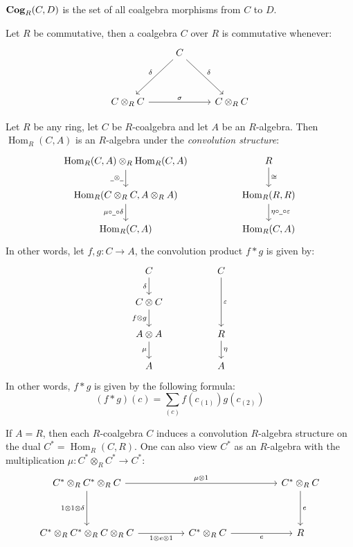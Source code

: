 \documentclass[8pt]{article}
\theoremstyle{definition}
\theoremstyle{definition}
\theoremstyle{definition}
\theoremstyle{definition}
\theoremstyle{definition}
\theoremstyle{definition}
\theoremstyle{definition}
\theoremstyle{definition}
\theoremstyle{definition}
\theoremstyle{definition}
\theoremstyle{definition}
\theoremstyle{definition}
\theoremstyle{definition}
\theoremstyle{definition}
\theoremstyle{question}
\begin{document}
${\bf Cog}_R(C, D)$ is the set of all coalgebra morphisms from $C$ to $D$. 

Let $R$ be commutative, then a coalgebra $C$ over $R$ is commutative whenever:
\[
\begin{tikzcd}
  & C \ar[ddl, "\delta"'] \ar[ddr, "\delta"] \\
  \\
  C \otimes_R C \ar[rr, "\sigma"] && C \otimes_R C
\end{tikzcd}
\]

Let $R$ be any ring, let $C$ be $R$-coalgebra and let $A$ be an $R$-algebra.
Then $\operatorname{Hom}_R(C, A)$ is an $R$-algebra under the \emph{convolution structure}:
\[
\begin{tikzcd}
  \operatorname{Hom}_R(C, A) \otimes_R \operatorname{Hom}_R(C, A) \ar[d, "\underline{\:\:} \otimes \underline{\:\:}"'] && R \ar[d, "\cong"] \\
  \operatorname{Hom}_R(C \otimes_R C, A \otimes_R A) \ar[d, "\mu \circ \underline{\:\:} \circ \delta"']                && \operatorname{Hom}_R(R, R) \ar[d, "\eta \circ \underline{\:\:} \circ \varepsilon"] \\
  \operatorname{Hom}_R(C, A)                                                                                           && \operatorname{Hom}_R(C, A)
\end{tikzcd}
\]
In other words, let $f, g : C \to A$, the convolution product $f * g$ is given by:
\[
\begin{tikzcd}
  C \ar[d, "\delta"']               && C \ar[dd, "\varepsilon"] \\
  C \otimes C \ar[d, "f \otimes g"'] \\
  A \otimes A \ar[d, "\mu"']        && R \ar[d, "\eta"] \\
  A                                 && A
\end{tikzcd}
\]
In other words, $f * g$ is given by the following formula:
\[
(f * g)(c) = \sum \limits_{(c)} f(c_{(1)}) g(c_{(2)})
\]

If $A = R$, then each $R$-coalgebra $C$ induces a convolution $R$-algebra structure
on the dual $C^* = \operatorname{Hom}_R(C, R)$. One can also view $C^*$ as an $R$-algebra
with the multiplication $\mu : C^* \otimes_R C^* \to C^*$:
\[
\begin{tikzcd}
  C^* \otimes_R C^* \otimes_R C \ar[rrrr, "\mu \otimes 1"] \ar[dd, "1 \otimes 1 \otimes \delta"'] &&&& C^* \otimes_R C \ar[dd, "e"] \\
  \\
  C^* \otimes_R C^* \otimes_R C \otimes_R C \ar[rr, "1 \otimes e \otimes 1"'] && C^* \otimes_R C \ar[rr, "e"'] && R
\end{tikzcd}
\]
\end{document}
